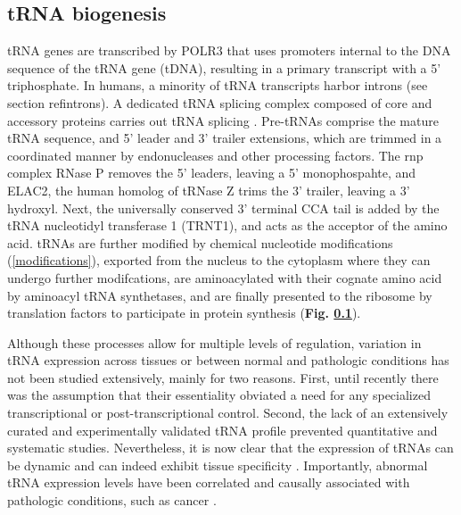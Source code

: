 \documentclass[12pt]{rockefeller}
\begin{document}
\subsection{tRNA biogenesis}\label{biogenesis}
tRNA genes are transcribed by POLR3 that uses promoters internal to the DNA sequence of the tRNA gene (tDNA), resulting in a primary transcript with a 5' triphosphate. In humans, a minority of tRNA transcripts harbor introns (see section ref{introns}). A dedicated tRNA splicing complex composed of core and accessory proteins carries out tRNA splicing \cite{trotta1999trna,Paushkin:2004wl,Weitzer:2007hda, Popow:2011ffa,Popow:2014ita}. Pre-tRNAs comprise the mature tRNA sequence, and 5' leader and 3' trailer extensions, which are trimmed in a coordinated manner by endonucleases and other processing factors. The \gls{rnp} complex RNase P removes the 5' leaders, leaving a 5' monophospahte, and ELAC2, the human homolog of tRNase Z trims the 3' trailer, leaving a 3' \gls{hydroxyl}. Next, the universally conserved 3' terminal CCA tail is added by the tRNA nucleotidyl transferase 1 (TRNT1), and acts as the acceptor of the amino acid. tRNAs are further modified by chemical nucleotide modifications (\ref{modifications}), exported from the nucleus to the cytoplasm where they can undergo further modifcations, are aminoacylated with their cognate amino acid by aminoacyl tRNA synthetases, and are finally presented to the ribosome by translation factors to participate in protein synthesis (\textbf{Fig. \ref{biogenesis}})\cite{Phizicky:2010jf,Hopper:2010ho,Hopper:2013dl}.

Although these processes allow for multiple levels of regulation, variation in tRNA expression across tissues or between normal and pathologic conditions has not been studied extensively, mainly for two reasons. First, until recently there was the assumption that their essentiality obviated a need for any specialized transcriptional or post-transcriptional control. Second, the lack of an extensively curated and experimentally validated tRNA profile prevented quantitative and systematic studies. Nevertheless, it is now clear that the expression of tRNAs can be dynamic and can indeed exhibit tissue specificity \cite{Dittmar:2006du,Gingold:2014iz}. Importantly, abnormal tRNA expression levels have been correlated and causally associated with pathologic conditions, such as cancer \cite{Gingold:2014iz,Goodarzi:2016gd}.
\newpage
\end{document}
